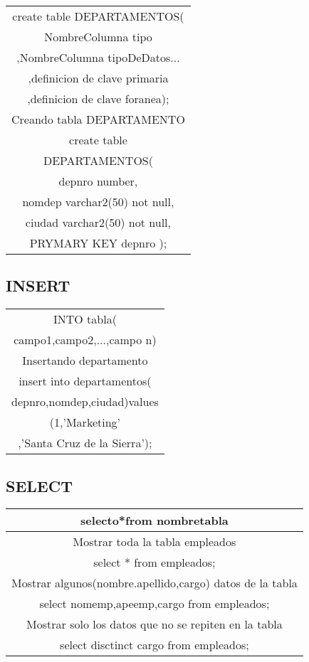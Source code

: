 \documentclass{article}
\begin{document}
\begin{multicols}{2}
\begin{tabular}{| c |}
                    create table DEPARTAMENTOS(\\
                    NombreColumna tipo \\ 
                    ,NombreColumna tipoDeDatos...\\
                    ,definicion de clave primaria \\
                    ,definicion de clave foranea);\\ \hline
                    Creando tabla DEPARTAMENTO\\ \hline
                    create table\\ 
            DEPARTAMENTOS(\\
             depnro number,\\ 
            nomdep varchar2(50) not null, \\ 
            ciudad varchar2(50) not null, \\ 
            PRYMARY KEY  depnro );\\ \hline
            

                    \end{tabular}
            
            \subsection{INSERT}
            \begin{tabular}{| c |}\hline 
                INTO tabla(\\
                campo1,campo2,...,campo n)\\ \hline
                Insertando departamento\\ \hline
                insert into departamentos(\\
                depnro,nomdep,ciudad)values\\
                 (1,'Marketing' \\
                 ,'Santa Cruz de la Sierra');\\ \hline
                \end{tabular}
            \subsection{SELECT}
            \begin{tabular}{| c |}\hline 
                selecto*from nombretabla\\ \hline
                Mostrar toda la tabla empleados\\ \hline
                select * from empleados; \\ \hline
                Mostrar algunos(nombre.apellido,cargo) datos de la tabla \\ \hline
                select nomemp,apeemp,cargo from empleados;\\ \hline
                Mostrar solo los datos que no se repiten en la tabla\\ \hline
                select disctinct cargo from empleados;\\ \hline
            \end{tabular}
         \end{multicols}

        
        
\end{document}
